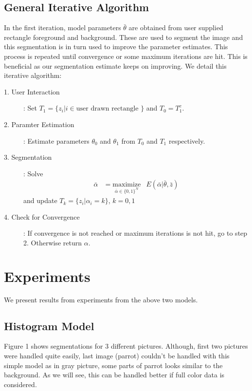 \documentclass[a4paper]{article}
\begin{document}
\subsection{General Iterative Algorithm}
In the first iteration, model parameters $\bar{\theta}$ are obtained from user supplied rectangle foreground and background. 
These are used to segment the image and this segmentation is in turn used to improve the parameter estimates. This process is repeated until convergence or some maximum iterations are hit.
This is beneficial as our segmentation estimate keeps on improving.
We detail this iterative algorithm:
\begin{description}
\item[1. User Interaction]:
Set $T_1 = \{z_i | i \in \text{user drawn rectangle }\}$ and $T_0 = T_1^c$. 

\item[2. Paramter Estimation]: Estimate parameters $\theta_0$ and $\theta_1$ from $T_0$ and $T_1$ respectively. 

\item[3. Segmentation]: Solve 
\begin{equation*}
\begin{aligned}
\bar{\alpha} &=  
 \underset{\bar{\alpha}\in\{0,1 \}^N}{\text{maximize}}
 & E(\bar{\alpha}| \bar{\theta},\bar{z} )
\end{aligned}
\end{equation*}
and update $T_k = \{z_i | \alpha_i = k\}$, $k = 0,1$

\item[4. Check for Convergence]: If convergence is not reached or maximum iterations is not hit,  
go to step 2. Otherwise return $\alpha$.
\end{description}

\section{Experiments}
We present results from experiments from the above two models.
\subsection{Histogram Model}
Figure 1 shows segmentations for 3 different pictures. 
Although, first two pictures were handled quite easily, last image (parrot) couldn't be handled with this simple model as in gray picture, some parts of parrot looks similar to the background. 
As we will see, this can be handled better if full color data is considered.
\end{document}
